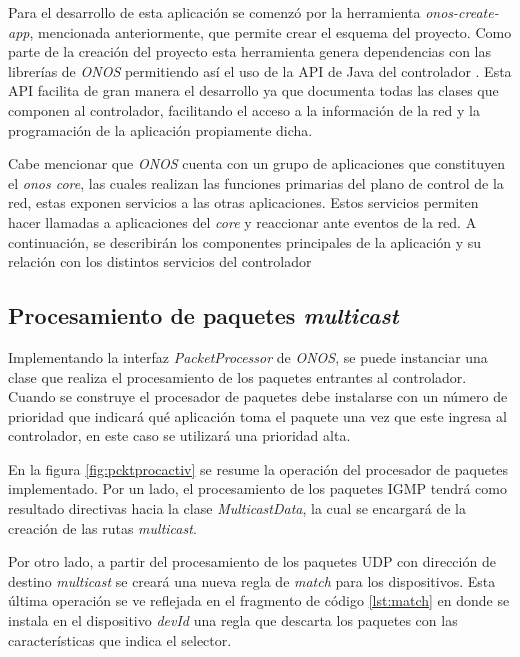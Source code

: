 Para el desarrollo de esta aplicación se comenzó por la herramienta \textit{onos-create-app}, mencionada anteriormente, que permite crear el esquema del proyecto. Como parte de la creación del proyecto esta herramienta genera dependencias con las librerías de \textit{ONOS} permitiendo así el uso de la API de Java del controlador \parencite{onosapi}. Esta API facilita de gran manera el desarrollo ya que documenta todas las clases que componen al controlador, facilitando el acceso a la información de la red y la programación de la aplicación propiamente dicha. \


Cabe mencionar que \textit{ONOS} cuenta con un grupo de aplicaciones que constituyen el \textit{onos core}, las cuales realizan las funciones primarias del plano de control de la red, estas exponen servicios a las otras aplicaciones. Estos servicios permiten hacer llamadas a aplicaciones del \textit{core} y reaccionar ante eventos de la red. A continuación, se describirán los componentes principales de la aplicación y su relación con los distintos servicios del controlador  \

\subsection{Procesamiento de paquetes \textit{multicast}}

Implementando la interfaz \textit{PacketProcessor} de \textit{ONOS}, se puede instanciar una clase que realiza el procesamiento de los paquetes entrantes al controlador. Cuando se construye el procesador de paquetes debe instalarse con un número de prioridad que indicará qué aplicación toma el paquete una vez que este ingresa al controlador, en este caso se utilizará una prioridad alta. \

En la figura \ref{fig:pcktprocactiv} se resume la operación del procesador de paquetes implementado. Por un lado, el procesamiento de los paquetes IGMP tendrá como resultado directivas hacia la clase \textit{MulticastData}, la cual se encargará de la creación de las rutas \textit{multicast}. \

Por otro lado, a partir del procesamiento de los paquetes UDP con dirección de destino \textit{multicast} se creará una nueva regla de \textit{match} para los dispositivos. Esta última operación se ve reflejada en el fragmento de código \ref{lst:match} en donde se instala en el dispositivo \textit{devId} una regla que descarta los paquetes con las características que indica el selector.
 
